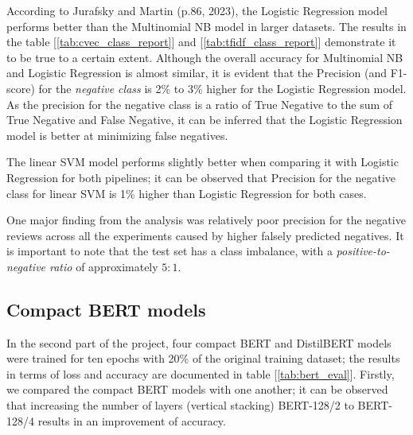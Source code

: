 \documentclass[11pt]{article}
\begin{document}
According to Jurafsky and Martin (p.86, 2023), the Logistic Regression model performs better than the Multinomial NB model in larger datasets. The results in the table [\ref{tab:cvec_class_report}] and [\ref{tab:tfidf_class_report}] demonstrate it to be true to a certain extent. Although the overall accuracy for Multinomial NB and Logistic Regression is almost similar, it is evident that the Precision (and F1-score) for the \textit{negative class} is 2\% to 3\% higher for the Logistic Regression model. As the precision for the negative class is a ratio of True Negative to the sum of True Negative and False Negative, it can be inferred that the Logistic Regression model is better at minimizing false negatives. 

The linear SVM model performs slightly better when comparing it with Logistic Regression for both pipelines; it can be observed that Precision for the negative class for linear SVM is 1\% higher than Logistic Regression for both cases.

One major finding from the analysis was relatively poor precision for the negative reviews across all the experiments caused by higher falsely predicted negatives. It is important to note that the test set has a class imbalance, with a \textit{positive-to-negative ratio} of approximately \textbf{$5:1$}. 

\subsection{Compact BERT models}
In the second part of the project, four compact BERT and DistilBERT models were trained for ten epochs with 20\% of the original training dataset; the results in terms of loss and accuracy are documented in table [\ref{tab:bert_eval}]. Firstly, we compared the compact BERT models with one another; it can be observed that increasing the number of layers (vertical stacking) {\small BERT-128/2}  to {\small BERT-128/4} results in an improvement of accuracy. 
\end{document}

